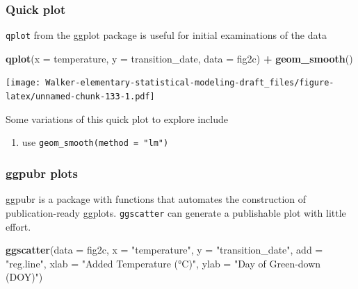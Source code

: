 \documentclass[]{book}
\newenvironment{Shaded}{\begin{snugshade}}{\end{snugshade}}
\newcommand{\DataTypeTok}[1]{\textcolor[rgb]{0.13,0.29,0.53}{#1}}
\newcommand{\KeywordTok}[1]{\textcolor[rgb]{0.13,0.29,0.53}{\textbf{#1}}}
\newcommand{\NormalTok}[1]{#1}
\newcommand{\OperatorTok}[1]{\textcolor[rgb]{0.81,0.36,0.00}{\textbf{#1}}}
\newcommand{\StringTok}[1]{\textcolor[rgb]{0.31,0.60,0.02}{#1}}
\providecommand{\tightlist}{%
  \setlength{\itemsep}{0pt}\setlength{\parskip}{0pt}}
\begin{document}
\hypertarget{quick-plot}{%
\subsubsection{Quick plot}\label{quick-plot}}

\texttt{qplot} from the ggplot package is useful for initial examinations of the data

\begin{Shaded}
\begin{Highlighting}[]
\KeywordTok{qplot}\NormalTok{(}\DataTypeTok{x =}\NormalTok{ temperature, }\DataTypeTok{y =}\NormalTok{ transition_date, }\DataTypeTok{data =}\NormalTok{ fig2c) }\OperatorTok{+}\StringTok{ }\KeywordTok{geom_smooth}\NormalTok{()}
\end{Highlighting}
\end{Shaded}

\texttt{[image: Walker-elementary-statistical-modeling-draft\_files/figure-latex/unnamed-chunk-133-1.pdf]}

Some variations of this quick plot to explore include

\begin{enumerate}
\def\labelenumi{\arabic{enumi}.}
\tightlist
\item
  use \texttt{geom\_smooth(method\ =\ "lm")}
\end{enumerate}

\hypertarget{ggpubr-plots}{%
\subsubsection{ggpubr plots}\label{ggpubr-plots}}

ggpubr is a package with functions that automates the construction of publication-ready ggplots. \texttt{ggscatter} can generate a publishable plot with little effort.

\begin{Shaded}
\begin{Highlighting}[]
\KeywordTok{ggscatter}\NormalTok{(}\DataTypeTok{data =}\NormalTok{ fig2c,}
          \DataTypeTok{x =} \StringTok{"temperature"}\NormalTok{,}
          \DataTypeTok{y =} \StringTok{"transition_date"}\NormalTok{,}
          \DataTypeTok{add =} \StringTok{"reg.line"}\NormalTok{,}
          \DataTypeTok{xlab =} \StringTok{"Added Temperature (°C)"}\NormalTok{,}
          \DataTypeTok{ylab =} \StringTok{"Day of Green-down (DOY)"}\NormalTok{)}
\end{Highlighting}
\end{Shaded}
\end{document}
